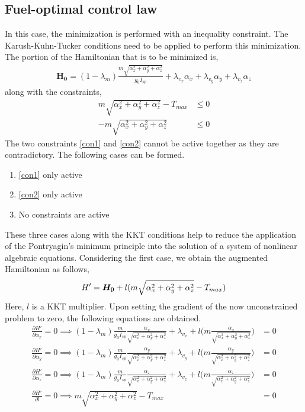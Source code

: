 \subsection{Fuel-optimal control law}
In this case, the minimization is performed with an inequality constraint. The Karush-Kuhn-Tucker conditions need to be applied to perform this minimization.
The portion of the Hamiltonian that is to be minimized is,
\begin{align}
	\boldsymbol{H_0}=(1-\lambda_m)\frac{m\sqrt{\alpha_x^2+\alpha_y^2+\alpha_z^2}}{g_0 I_{sp}}+\lambda_{v_x}\alpha_x+\lambda_{v_y}\alpha_y+\lambda_{v_z}\alpha_z
\end{align}
along with the constraints, 
\begin{align}
	m\sqrt{\alpha_x^2+\alpha_y^2+\alpha_z^2}-T_{max}&\leq 0\label{con1}\\
	-m\sqrt{\alpha_x^2+\alpha_y^2+\alpha_z^2}&\leq 0\label{con2}
\end{align}
The two constraints \ref{con1} and \ref{con2} cannot be active together as they are contradictory. The following cases can be formed.
\begin{enumerate}
	\item \ref{con1} only active
	\item \ref{con2} only active
	\item No constraints are active
\end{enumerate}
These three cases along with the KKT conditions help to reduce the application of the Pontryagin's minimum principle into the solution of a system of nonlinear algebraic equations. 
Considering the first case, we obtain the augmented Hamiltonian as follows,
\begin{align}
	\boldmath{H'}=\boldsymbol{H_0}+l(	m\sqrt{\alpha_x^2+\alpha_y^2+\alpha_z^2}-T_{max})
\end{align}
Here, $l$ is a KKT multiplier. Upon setting the gradient of the now unconstrained problem to zero, the following equations are obtained.
\begin{align}
\frac{\partial H'}{\partial \alpha_x}=0\implies	(1-\lambda_m)\frac{m}{g_0 I_{sp}}\frac{\alpha_x}{\sqrt{\alpha_x^2+\alpha_y^2+\alpha_z^2}}+\lambda_{v_x}+l\bigg(m\frac{\alpha_x}{	\sqrt{\alpha_x^2+\alpha_y^2+\alpha_z^2}}\bigg)&=0\label{eqna}\\
\frac{\partial H'}{\partial \alpha_y}=0\implies	(1-\lambda_m)\frac{m}{g_0 I_{sp}}\frac{\alpha_y}{\sqrt{\alpha_x^2+\alpha_y^2+\alpha_z^2}}+\lambda_{v_y}+l\bigg(m\frac{\alpha_y}{	\sqrt{\alpha_x^2+\alpha_y^2+\alpha_z^2}}\bigg)&=0\label{eqnb}\\
\frac{\partial H'}{\partial \alpha_z}=0\implies	(1-\lambda_m)\frac{m}{g_0 I_{sp}}\frac{\alpha_z}{\sqrt{\alpha_x^2+\alpha_y^2+\alpha_z^2}}+\lambda_{v_z}+l\bigg(m\frac{\alpha_z}{	\sqrt{\alpha_x^2+\alpha_y^2+\alpha_z^2}}\bigg)&=0\label{eqnc}\\
\frac{\partial H'}{\partial l}=0\implies	m\sqrt{\alpha_x^2+\alpha_y^2+\alpha_z^2}-T_{max}&=0\label{eqnd}
\end{align}
